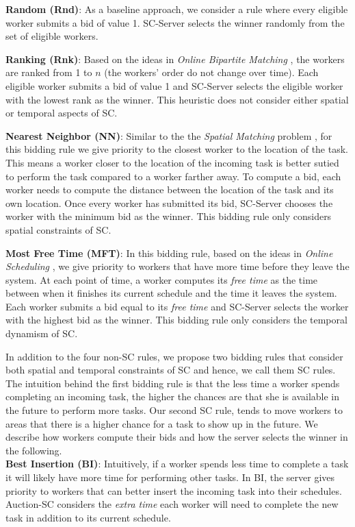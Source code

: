 \noindent\textbf{Random (Rnd)}:
As a baseline approach, we consider a rule where every eligible worker submits a bid of value 1. SC-Server selects the winner randomly from the set of eligible workers.

\noindent\textbf{Ranking (Rnk)}:
Based on the ideas in \emph{Online Bipartite Matching} \cite{Karp90}, the workers are ranked from 1 to $n$ (the workers' order do not change over time). Each eligible worker submits a bid of value 1 and SC-Server selects the eligible worker with the lowest rank as the winner. This heuristic does not consider either spatial or temporal aspects of SC.

\noindent\textbf{Nearest Neighbor (NN)}:
Similar to the the \emph{Spatial Matching} problem \cite{Wong07}, for this bidding rule we give priority to the closest worker to the location of the task. This means a worker closer to the location of the incoming task is better sutied to perform the task compared to a worker farther away. To compute a bid, each worker needs to compute the distance between the location of the task and its own location. Once every worker has submitted its bid, SC-Server chooses the worker with the minimum bid as the winner. This bidding rule only considers spatial constraints of SC.

\noindent\textbf{Most Free Time (MFT)}:
In this bidding rule, based on the ideas in \emph{Online Scheduling} \cite{Lee13}, we give priority to workers that have more time before they leave the system. At each point of time, a worker computes its \emph{free time} as the time between when it finishes its current schedule and the time it leaves the system. Each worker submits a bid equal to its \emph{free time} and SC-Server selects the worker with the highest bid as the winner. This bidding rule only considers the temporal dynamism of SC.
 
In addition to the four non-SC rules, we propose two bidding rules that consider both spatial and temporal constraints of SC and hence, we call them SC rules. The intuition behind the first bidding rule is that the less time a worker spends completing an incoming task, the higher the chances are that she is available in the future to perform more tasks. Our second SC rule, tends to move workers to areas that there is a higher chance for a task to show up in the future. We describe how workers compute their bids and how the server selects the winner in the following.\\

\noindent \textbf{Best Insertion (BI)}: 
Intuitively, if a worker spends less time to complete a task it will likely have more time for performing other tasks. In BI, the server gives priority to workers that can better insert the incoming task into their schedules. Auction-SC considers the \textit{extra time} each worker will need to complete the new task in addition to its current schedule.

